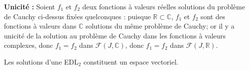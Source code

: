 \documentclass{article}
\begin{document}
\begin{question_kholle}
	\textbf{Unicité : }Soient $f_{1}$ et $f_{2}$ deux fonctions à valeurs réelles solutions du problème de Cauchy ci-dessus fixées quelconques : puisque $\mathbb{R} \subset \mathbb{C}$, $f_{1}$ et $f_{2}$ sont des fonctions à valeurs dans $\mathbb{C}$ solutions du même problème de Cauchy; or il y a unicité de la solution au problème de Cauchy dans les fonctions à valeurs complexes, donc $f_{1} = f_{2}$ dans $\mathcal{F}(J, \mathbb{C})$, donc $f_{1} = f_{2}$ dans $\mathcal{F}(J, \mathbb{R})$.
	\end{question_kholle}
	
	\begin{question_kholle}[
		Soient $(a,b)\in \mathbb{C}^2$, $f$ et $g$ les  solutions, définies sur $\mathbb{R}$ à valeurs
		dans $\mathbb{C}$, des problèmes de Cauchy suivants :
		\[
		    \left\{ \begin{array}{cl}
		        y'' +ay'+by = 0 \\
		        y(3) = 1\\
		        y'(3) = 0
		        \end{array} \right.        
			\quad \text{et} \quad
		    \left\{ \begin{array}{cl}
		        y'' +ay'+by = 0 \\
		        y(3) = 0\\
		        y'(3) = 1
		        \end{array} \right.
		\]
		
		Comment s'exprime la solution définie sur $\mathbb{R}$ de $\left\{ \begin{array}{cl}
		    y'' +ay'+by = 0 \\
		    y(3) = \alpha \\
		    y'(3) = \beta
		    \end{array} \right. $ pour $(\alpha, \beta)\in \mathbb{R}^2$ fixés ? 
		
		Peut-on affirmer que le plan vectoriel des solutions définies sur $\mathbb{R}$ à valeurs dans 
		$\mathbb{C}$ de $y'' + ay' + by = 0$ est $\{ \lambda \cdot f + \mu \cdot g  | 
		(\lambda, \mu)\in \mathbb{C}^2\}$
		]
		{Les solutions d'une EDL$_2$ constituent un espace vectoriel.}
	

\end{question_kholle}
\end{document}
